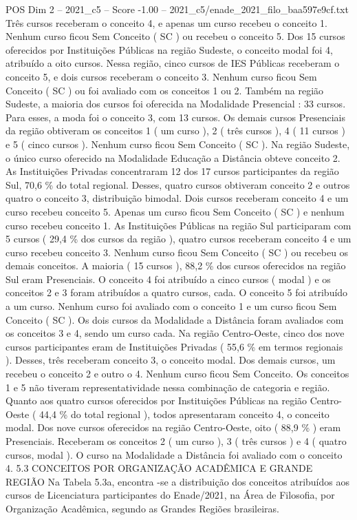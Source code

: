 \begin{textsample}{POS Dim 2 – 2021\_c5 – Score -1.00 – 2021\_c5/enade\_2021\_filo\_baa597e9cf.txt}
Três cursos receberam o conceito 4, e apenas um curso recebeu o conceito 1.
Nenhum curso ficou Sem Conceito ( SC ) ou recebeu o conceito 5.
Dos 15 cursos oferecidos por Instituições Públicas na região Sudeste, o conceito modal foi 4, atribuído a oito cursos.
Nessa região, cinco cursos de IES Públicas receberam o conceito 5, e dois cursos receberam o conceito 3.
Nenhum curso ficou Sem Conceito ( SC ) ou foi avaliado com os conceitos 1 ou 2.
Também na região Sudeste, a maioria dos cursos foi oferecida na Modalidade Presencial : 33 cursos.
Para esses, a moda foi o conceito 3, com 13 cursos.
Os demais cursos Presenciais da região obtiveram os conceitos 1 ( um curso ), 2 ( três cursos ), 4 ( 11 cursos ) e 5 ( cinco cursos ).
Nenhum curso ficou Sem Conceito ( SC ).
Na região Sudeste, o único curso oferecido na Modalidade Educação a Distância obteve conceito 2.
As Instituições Privadas concentraram 12 dos 17 cursos participantes da região Sul, 70,6 \% do total regional.
Desses, quatro cursos obtiveram conceito 2 e outros quatro o conceito 3, distribuição bimodal.
Dois cursos receberam conceito 4 e um curso recebeu conceito 5.
Apenas um curso ficou Sem Conceito ( SC ) e nenhum curso recebeu conceito 1.
As Instituições Públicas na região Sul participaram com 5 cursos ( 29,4 \% dos cursos da região ), quatro cursos receberam conceito 4 e um curso recebeu conceito 3.
Nenhum curso ficou Sem Conceito ( SC ) ou recebeu os demais conceitos.
A maioria ( 15 cursos ), 88,2 \% dos cursos oferecidos na região Sul eram Presenciais.
O conceito 4 foi atribuído a cinco cursos ( modal ) e os conceitos 2 e 3 foram atribuídos a quatro cursos, cada.
O conceito 5 foi atribuído a um curso.
Nenhum curso foi avaliado com o conceito 1 e um curso ficou Sem Conceito ( SC ).
Os dois cursos da Modalidade a Distância foram avaliados com os conceitos 3 e 4, sendo um curso cada.
Na região Centro-Oeste, cinco dos nove cursos participantes eram de Instituições Privadas ( 55,6 \% em termos regionais ).
Desses, três receberam conceito 3, o conceito modal.
Dos demais cursos, um recebeu o conceito 2 e outro o 4.
Nenhum curso ficou Sem Conceito.
Os conceitos 1 e 5 não tiveram representatividade nessa combinação de categoria e região.
Quanto aos quatro cursos oferecidos por Instituições Públicas na região Centro-Oeste ( 44,4 \% do total regional ), todos apresentaram conceito 4, o conceito modal.
Dos nove cursos oferecidos na região Centro-Oeste, oito ( 88,9 \% ) eram Presenciais.
Receberam os conceitos 2 ( um curso ), 3 ( três cursos ) e 4 ( quatro cursos, modal ).
O curso na Modalidade a Distância foi avaliado com o conceito 4. 5.3 CONCEITOS POR ORGANIZAÇÃO ACADÊMICA E GRANDE REGIÃO Na Tabela 5.3a, encontra -se a distribuição dos conceitos atribuídos aos cursos de Licenciatura participantes do Enade/2021, na Área de Filosofia, por Organização Acadêmica, segundo as Grandes Regiões brasileiras.

\end{textsample}
